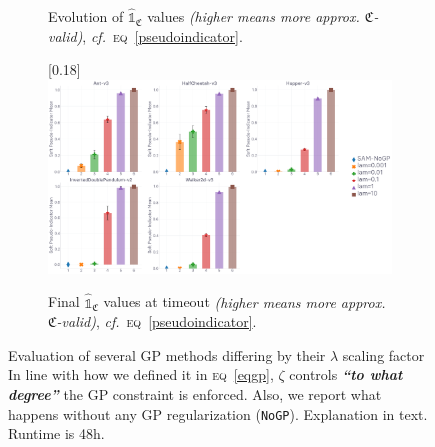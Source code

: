 \begin{figure}
\begin{subfigure}[t]{0.99\textwidth}
    \caption{Evolution of $\widehat{\mathds{1}}_\mathfrak{C}$ values
    \textit{(higher means more approx. $\mathfrak{C}$-valid)}, \textit{cf.}~\textsc{eq}~\ref{pseudoindicator}.}
  \end{subfigure}
  \begin{subfigure}[t]{0.99\textwidth}
    \center\scalebox{0.18}[0.18]{\includegraphics{Plots/gs_lambda_5envs/plots_mod_1_barplot.pdf}}
    \caption{Final $\widehat{\mathds{1}}_\mathfrak{C}$ values at timeout
    \textit{(higher means more approx. $\mathfrak{C}$-valid)}, \textit{cf.}~\textsc{eq}~\ref{pseudoindicator}.}
  \end{subfigure}
  \caption{
  Evaluation of several GP methods differing by their $\lambda$ scaling factor
  In line with how we defined it in \textsc{eq}~\ref{eqgp},
  $\zeta$ controls \textbf{\emph{``to what degree''}} the GP constraint is enforced.
  Also, we report what happens without any GP regularization (\texttt{NoGP}).
  Explanation in text.
  Runtime is 48h.}
  \label{pseudoindicatoremplambda}
\end{figure}

